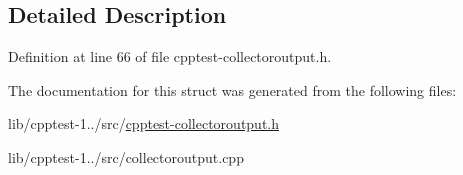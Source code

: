 \subsection{Detailed Description}


Definition at line 66 of file cpptest-\/collectoroutput.\+h.



The documentation for this struct was generated from the following files\+:\begin{DoxyCompactItemize}
\item 
lib/cpptest-\/1../src/\hyperlink{cpptest-collectoroutput_8h}{cpptest-\/collectoroutput.\+h}\item 
lib/cpptest-\/1../src/collectoroutput.\+cpp\end{DoxyCompactItemize}
